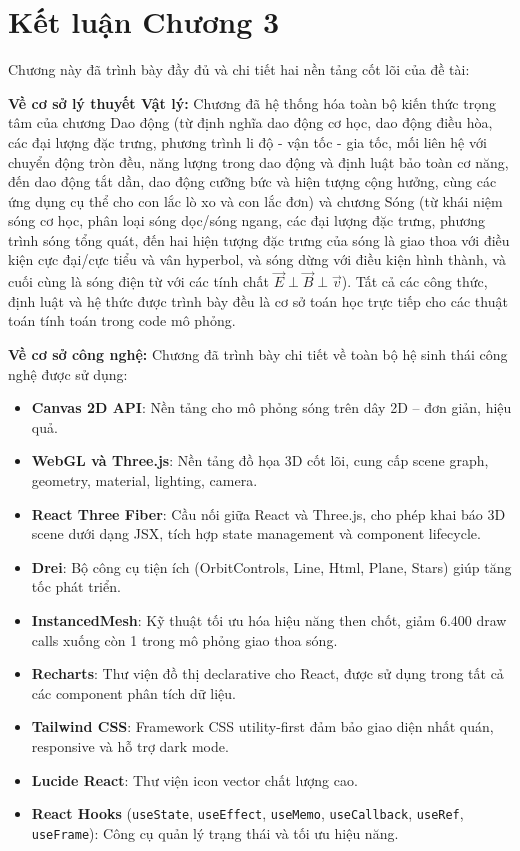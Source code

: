 \section{Kết luận Chương 3}

Chương này đã trình bày đầy đủ và chi tiết hai nền tảng cốt lõi của đề tài:

\textbf{Về cơ sở lý thuyết Vật lý:} Chương đã hệ thống hóa toàn bộ kiến thức trọng tâm của chương Dao động (từ định nghĩa dao động cơ học, dao động điều hòa, các đại lượng đặc trưng, phương trình li độ - vận tốc - gia tốc, mối liên hệ với chuyển động tròn đều, năng lượng trong dao động và định luật bảo toàn cơ năng, đến dao động tắt dần, dao động cưỡng bức và hiện tượng cộng hưởng, cùng các ứng dụng cụ thể cho con lắc lò xo và con lắc đơn) và chương Sóng (từ khái niệm sóng cơ học, phân loại sóng dọc/sóng ngang, các đại lượng đặc trưng, phương trình sóng tổng quát, đến hai hiện tượng đặc trưng của sóng là giao thoa với điều kiện cực đại/cực tiểu và vân hyperbol, và sóng dừng với điều kiện hình thành, và cuối cùng là sóng điện từ với các tính chất $\vec{E} \perp \vec{B} \perp \vec{v}$). Tất cả các công thức, định luật và hệ thức được trình bày đều là cơ sở toán học trực tiếp cho các thuật toán tính toán trong code mô phỏng.

\textbf{Về cơ sở công nghệ:} Chương đã trình bày chi tiết về toàn bộ hệ sinh thái công nghệ được sử dụng:
\begin{itemize}
    \item \textbf{Canvas 2D API}: Nền tảng cho mô phỏng sóng trên dây 2D – đơn giản, hiệu quả.
    \item \textbf{WebGL và Three.js}: Nền tảng đồ họa 3D cốt lõi, cung cấp scene graph, geometry, material, lighting, camera.
    \item \textbf{React Three Fiber}: Cầu nối giữa React và Three.js, cho phép khai báo 3D scene dưới dạng JSX, tích hợp state management và component lifecycle.
    \item \textbf{Drei}: Bộ công cụ tiện ích (OrbitControls, Line, Html, Plane, Stars) giúp tăng tốc phát triển.
    \item \textbf{InstancedMesh}: Kỹ thuật tối ưu hóa hiệu năng then chốt, giảm 6.400 draw calls xuống còn 1 trong mô phỏng giao thoa sóng.
    \item \textbf{Recharts}: Thư viện đồ thị declarative cho React, được sử dụng trong tất cả các component phân tích dữ liệu.
    \item \textbf{Tailwind CSS}: Framework CSS utility-first đảm bảo giao diện nhất quán, responsive và hỗ trợ dark mode.
    \item \textbf{Lucide React}: Thư viện icon vector chất lượng cao.
    \item \textbf{React Hooks} (\texttt{useState}, \texttt{useEffect}, \texttt{useMemo}, \texttt{useCallback}, \texttt{useRef}, \texttt{useFrame}): Công cụ quản lý trạng thái và tối ưu hiệu năng.
\end{itemize}

